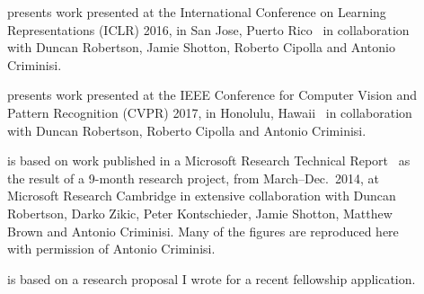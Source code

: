 \begin{acknowledgements}
\begin{description}
	\item[] presents work presented at the International Conference on Learning Representations (ICLR) 2016, in San Jose, Puerto Rico~\citep{Ioannou2016} in collaboration with Duncan Robertson, Jamie Shotton, Roberto Cipolla and Antonio Criminisi.

	\item[] presents work presented at the IEEE Conference for Computer Vision and Pattern Recognition (CVPR) 2017, in Honolulu, Hawaii~\citep{ioannou2016e} in collaboration with Duncan Robertson, Roberto Cipolla and Antonio Criminisi.
	
	\item[] is based on work published in a Microsoft Research Technical Report~\citep{Ioannou2015} as the result of a 9-month research project, from March--Dec.~2014, at Microsoft Research Cambridge in extensive collaboration with Duncan Robertson, Darko Zikic, Peter Kontschieder, Jamie Shotton, Matthew Brown and Antonio Criminisi. Many of the figures are reproduced here with permission of Antonio Criminisi.

	\item[] is based on a research proposal I wrote for a recent fellowship application.
\end{description}
\end{acknowledgements}
